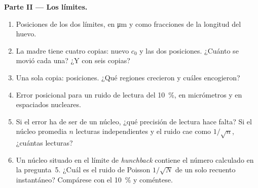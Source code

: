 \begin{problem}
\medskip
\noindent\textbf{Parte II --- Los límites.}
\begin{enumerate}[resume]
  \item Posiciones de los dos límites, en \unit{\micro m} y como
        fracciones de la longitud del huevo.
  \item La madre tiene cuatro copias: nuevo $c_{0}$ y las dos
        posiciones. ¿Cuánto se movió cada una? ¿Y con seis copias?
  \item Una sola copia: posiciones. ¿Qué regiones crecieron y cuáles
        encogieron?
  \item Error posicional para un ruido de lectura del \qty{10}{\%}, en
        micrómetros y en espaciados nucleares.
  \item Si el error ha de ser de un núcleo, ¿qué precisión de lectura
        hace falta? Si el núcleo promedia $n$ lecturas independientes y
        el ruido cae como $1/\sqrt{n}$, ¿cuántas lecturas?
  \item Un núcleo situado en el límite de \emph{hunchback} contiene el
        número calculado en la pregunta~5. ¿Cuál es el ruido de Poisson
        $1/\sqrt{N}$ de un solo recuento instantáneo? Compárese con el
        \qty{10}{\%} y coméntese.
\end{enumerate}


\end{problem}
